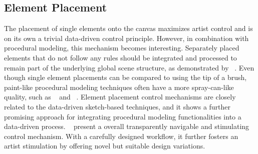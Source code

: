 \subsection{Element Placement}
\label{subsubsec:analysis_creative_means_elements}

The placement of single elements onto the canvas maximizes artist control and is on its own a trivial data-driven control principle. However, in combination with procedural modeling, this mechanism becomes interesting. Separately placed elements that do not follow any rules should be integrated and processed to remain part of the underlying global scene structure, as demonstrated by \citeauthor*{gieseke_2017_ooo}~\cite{gieseke_2017_ooo}. Even though single element placements can be compared to using the tip of a brush, paint-like procedural modeling techniques often have a more spray-can-like quality, such as \citeauthor*{hsu_2020_aef}~\cite{hsu_2020_aef} and \citeauthor*{mech_2012_tdf}~\cite{mech_2012_tdf}. Element placement control mechanisms are closely related to the data-driven sketch-based techniques, and it shows a further promising approach for integrating procedural modeling functionalities into a data-driven process. \citeauthor*{guerrero_2016_pep}~\cite{guerrero_2016_pep} present a overall transparently navigable and stimulating control mechanism. With a carefully designed workflow, it further fosters an artist stimulation by offering novel but suitable design variations.

